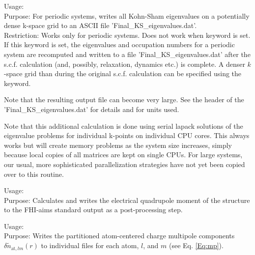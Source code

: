 {
  \noindent
  Usage:   \\[1.0ex]
  Purpose: For periodic systems, writes all Kohn-Sham eigenvalues on a
    potentially dense k-space grid to an ASCII file 'Final\_KS\_eigenvalues.dat'. \\[1.0ex]
  Restriction: Works only for periodic systems. Does not work when keyword
     is set. \\[1.0ex]
}
If this keyword is set, the eigenvalues and occupation numbers for a periodic system are
recomputed and written to a file 'Final\_KS\_eigenvalues.dat' after the s.c.f. calculation
(and, possibly, relaxation, dynamics etc.) is complete. A denser $k$-space grid than during 
the original s.c.f. calculation can be specified using the  keyword. 

Note that the resulting output file can become very large. See the header of the 
'Final\_KS\_eigenvalues.dat' for details and for units used.

Note that this additional calculation is done using serial lapack solutions
of the eigenvalue problems for individual k-points on individual CPU cores.
This always works but will create memory problems as the system size increases,
simply because local copies of all matrices are kept on single CPUs. For large
systems, our usual, more sophisticated parallelization strategies have not yet
been copied over to this routine.

{
  \noindent
  Usage:   \\[1.0ex]
  Purpose: Calculates and writes the electrical quadrupole moment of the
    structure to the FHI-aims standard output as a post-processing step. \\[1.0ex]
}

{
  \noindent
  Usage:   \\[1.0ex]
  Purpose: Writes the partitioned atom-centered charge multipole 
    components $\delta\tilde{n}_{\text{at},lm}(r)$ to individual files
    for each atom, $l$, and $m$ (see Eq. \ref{Eq:mp}). \\[1.0ex]
}

